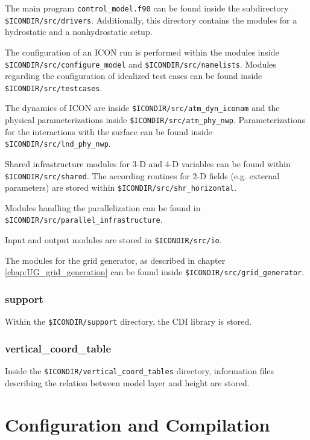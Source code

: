 The main program \verb+control_model.f90+ can be found inside the subdirectory \newline \verb+$ICONDIR/src/drivers+. Additionally, this directory contains the modules for a hydrostatic and a nonhydrostatic setup.

The configuration of an ICON run is performed within the modules inside \newline \verb+$ICONDIR/src/configure_model+ and \verb+$ICONDIR/src/namelists+. Modules regarding the configuration of idealized test cases can be found inside \verb+$ICONDIR/src/testcases+.

The dynamics of ICON are inside \verb+$ICONDIR/src/atm_dyn_iconam+ and the physical parameterizations inside \verb+$ICONDIR/src/atm_phy_nwp+. Parameterizations for the interactions with the surface can be found inside \verb+$ICONDIR/src/lnd_phy_nwp+.

Shared infrastructure modules for 3-D and 4-D variables can be found within \newline \verb+$ICONDIR/src/shared+. The according routines for 2-D fields (e.g. external parameters) are stored within \verb+$ICONDIR/src/shr_horizontal+.

Modules handling the parallelization can be found in \newline\verb+$ICONDIR/src/parallel_infrastructure+.

Input and output modules are stored in \verb+$ICONDIR/src/io+.

The modules for the grid generator, as described in chapter \ref{chap:UG_grid_generation} can be found inside \newline \verb+$ICONDIR/src/grid_generator+.

\subsubsection{support}

Within the \verb+$ICONDIR/support+ directory, the CDI library is stored. 

\subsubsection{vertical\_coord\_table}

Inside the \verb+$ICONDIR/vertical_coord_tables+ directory, information files describing the relation between model layer and height are stored.

\section{Configuration and Compilation}
\label{chap:UG_config_compil}

